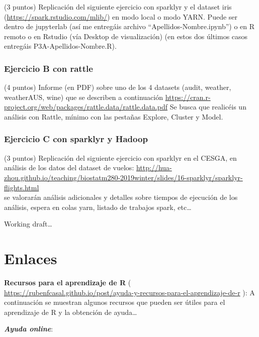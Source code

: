 \documentclass[]{book}
\begin{document}
(3 puntos) Replicación del siguiente ejercicio con sparklyr y el dataset iris (\url{https://spark.rstudio.com/mlib/}) en modo local o modo YARN. Puede ser dentro de jupyterlab (así me entregáis archivo ``Apellidos-Nombre.ipynb'') o en R remoto o en Rstudio (vía Desktop de visualización) (en estos dos últimos casos entregáis P3A-Apellidos-Nombre.R).

\hypertarget{ejercicio-b-con-rattle}{%
\subsection{Ejercicio B con rattle}\label{ejercicio-b-con-rattle}}

(4 puntos) Informe (en PDF) sobre uno de los 4 datasets (audit, weather, weatherAUS, wine) que se describen a continuación \url{https://cran.r-project.org/web/packages/rattle.data/rattle.data.pdf}
Se busca que realicéis un análisis con Rattle, mínimo con las pestañas Explore, Cluster y Model.

\hypertarget{ejercicio-c-con-sparklyr-y-hadoop}{%
\subsection{Ejercicio C con sparklyr y Hadoop}\label{ejercicio-c-con-sparklyr-y-hadoop}}

(3 puntos) Replicación del siguiente ejercicio con sparklyr en el CESGA, en análisis de los datos del dataset de vuelos:
\url{http://hua-zhou.github.io/teaching/biostatm280-2019winter/slides/16-sparklyr/sparklyr-flights.html}\\
se valorarán análisis adicionales y detalles sobre tiempos de ejecución de los análisis, espera en colas yarn, listado de trabajos spark, etc\ldots{}

\hypertarget{appendix-apendices}{%
\appendix}


Working draft\ldots{}

\hypertarget{links}{%
\chapter{Enlaces}\label{links}}

\textbf{Recursos para el aprendizaje de R} ( \url{https://rubenfcasal.github.io/post/ayuda-y-recursos-para-el-aprendizaje-de-r}
): A continuación se muestran algunos recursos que pueden ser útiles para el aprendizaje de R y la obtención de ayuda\ldots{}

\textbf{\emph{Ayuda online}}:
\end{document}

